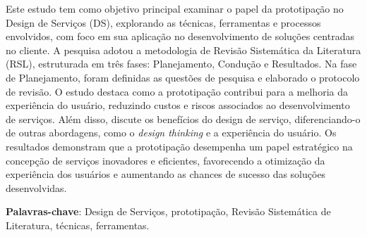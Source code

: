 \begin{resumo}
Este estudo tem como objetivo principal examinar o papel da prototipação no Design de Serviços (DS), explorando as técnicas, ferramentas e processos envolvidos, com foco em sua aplicação no desenvolvimento de soluções centradas no cliente. A pesquisa adotou a metodologia de Revisão Sistemática da Literatura (RSL), estruturada em três fases: Planejamento, Condução e Resultados. Na fase de Planejamento, foram definidas as questões de pesquisa e elaborado o protocolo de revisão. O estudo destaca como a prototipação contribui para a melhoria da experiência do usuário, reduzindo custos e riscos associados ao desenvolvimento de serviços. Além disso, discute os benefícios do design de serviço, diferenciando-o de outras abordagens, como o \textit{design thinking} e a experiência do usuário. Os resultados demonstram que a prototipação desempenha um papel estratégico na concepção de serviços inovadores e eficientes, favorecendo a otimização da experiência dos usuários e aumentando as chances de sucesso das soluções desenvolvidas.

 \vspace{\onelineskip}
    
 \noindent
 \textbf{Palavras-chave}: Design de Serviços, prototipação, Revisão Sistemática de Literatura, técnicas, ferramentas.
\end{resumo}

